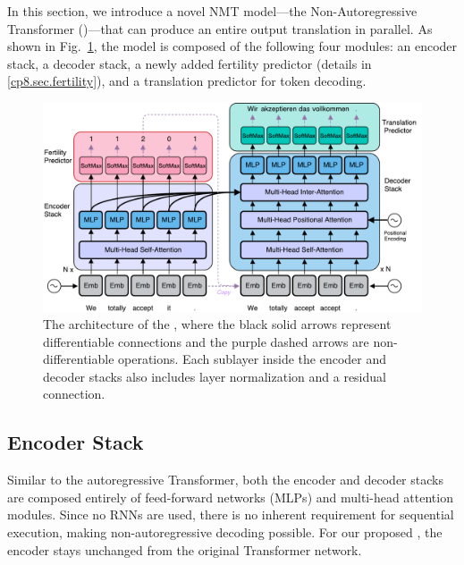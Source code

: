 In this section, we introduce a novel NMT model---the Non-Autoregressive Transformer (\model)---that can produce an entire output translation in parallel.
As shown in Fig.~\ref{cp8.fig.diagram}, the model is composed of the following four modules: 
an encoder stack, 
a decoder stack, 
a newly added fertility predictor (details in \ref{cp8.sec.fertility}), and a translation predictor for token decoding. 

\begin{figure}[t]
\centering
\includegraphics[width=\textwidth]{figs/nat/NAT-sub}
\caption{\label{cp8.fig.diagram} The architecture of the \model{}, where the black solid arrows represent differentiable connections and the purple dashed arrows are non-differentiable operations. Each sublayer inside the encoder and decoder stacks also includes layer normalization and a residual connection.}
\end{figure}

\subsection{Encoder Stack}
Similar to the autoregressive Transformer, both the encoder and decoder stacks are composed entirely of feed-forward networks (MLPs) and multi-head attention modules. Since no RNNs are used, there is no inherent requirement for sequential execution, making non-autoregressive decoding possible.
For our proposed \model{}, the encoder stays unchanged from the original Transformer network.

